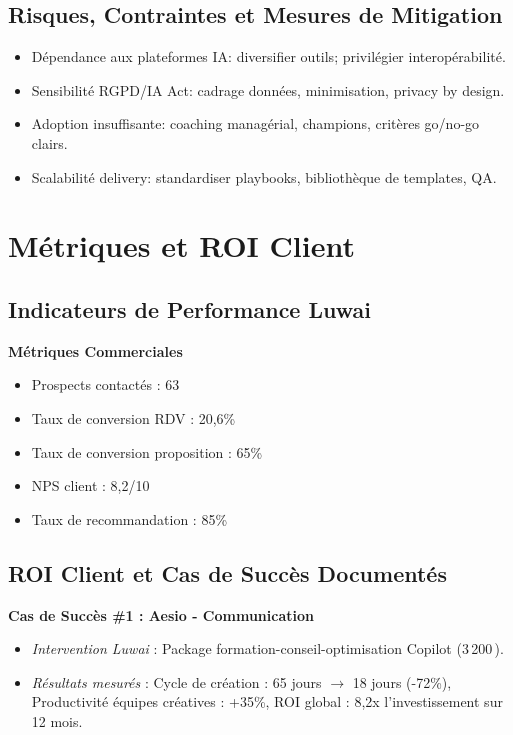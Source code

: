 \subsection{Risques, Contraintes et Mesures de Mitigation}
\begin{itemize}
    \item Dépendance aux plateformes IA: diversifier outils; privilégier interopérabilité.
    \item Sensibilité RGPD/IA Act: cadrage données, minimisation, privacy by design.
    \item Adoption insuffisante: coaching managérial, champions, critères go/no-go clairs.
    \item Scalabilité delivery: standardiser playbooks, bibliothèque de templates, QA.
\end{itemize}

\section{Métriques et ROI Client}

\subsection{Indicateurs de Performance Luwai}

\textbf{Métriques Commerciales}
\begin{itemize}
    \item Prospects contactés : 63
    \item Taux de conversion RDV : 20,6\%
    \item Taux de conversion proposition : 65\%
    \item NPS client : 8,2/10
    \item Taux de recommandation : 85\%
\end{itemize}

\subsection{ROI Client et Cas de Succès Documentés}

\textbf{Cas de Succès \#1 : Aesio - Communication}
\begin{itemize}
    \item \emph{Intervention Luwai} : Package formation-conseil-optimisation Copilot (3\,200\,\texteuro{}).
    \item \emph{Résultats mesurés} : Cycle de création : 65 jours $\rightarrow$ 18 jours (-72\%), Productivité équipes créatives : +35\%, ROI global : 8,2x l'investissement sur 12 mois.
\end{itemize}

